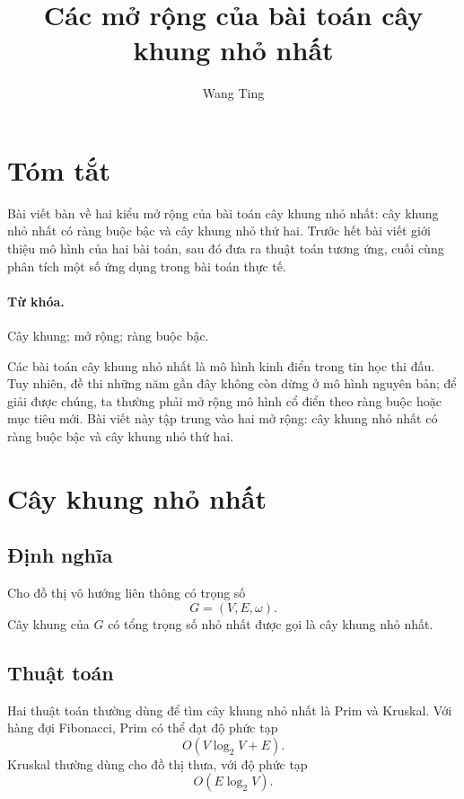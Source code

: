 \documentclass[11pt]{article}
\title{Các mở rộng của bài toán cây khung nhỏ nhất}
\author{Wang Ting}
\date{}
\begin{document}
\maketitle


\section*{Tóm tắt}

Bài viết bàn về hai kiểu mở rộng của bài toán cây khung nhỏ nhất: cây khung
nhỏ nhất có ràng buộc bậc và cây khung nhỏ thứ hai. Trước hết bài viết giới
thiệu mô hình của hai bài toán, sau đó đưa ra thuật toán tương ứng, cuối cùng
phân tích một số ứng dụng trong bài toán thực tế.

\paragraph{Từ khóa.}
Cây khung; mở rộng; ràng buộc bậc.

Các bài toán cây khung nhỏ nhất là mô hình kinh điển trong tin học thi đấu.
Tuy nhiên, đề thi những năm gần đây không còn dừng ở mô hình nguyên bản; để
giải được chúng, ta thường phải mở rộng mô hình cổ điển theo ràng buộc hoặc
mục tiêu mới. Bài viết này tập trung vào hai mở rộng: cây khung nhỏ nhất có
ràng buộc bậc và cây khung nhỏ thứ hai.

\section{Cây khung nhỏ nhất}

\subsection{Định nghĩa}

Cho đồ thị vô hướng liên thông có trọng số
\[
  G=(V,E,\omega).
\]
Cây khung của $G$ có tổng trọng số nhỏ nhất được gọi là cây khung nhỏ nhất.

\subsection{Thuật toán}

Hai thuật toán thường dùng để tìm cây khung nhỏ nhất là Prim và Kruskal. Với
hàng đợi Fibonacci, Prim có thể đạt độ phức tạp
\[
  O(V\log_2 V+E).
\]
Kruskal thường dùng cho đồ thị thưa, với độ phức tạp
\[
  O(E\log_2 V).
\]
\end{document}
